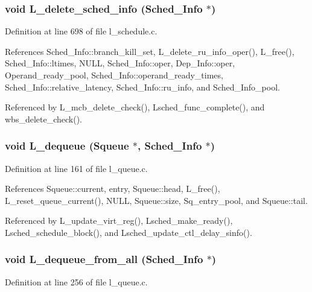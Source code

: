 \subsubsection{\setlength{\rightskip}{0pt plus 5cm}void L\_\-delete\_\-sched\_\-info (\bf{Sched\_\-Info} $\ast$)}\label{l__schedule_8h_fc54ef260623cbb0b6e6c13ab288d747}




Definition at line 698 of file l\_\-schedule.c.

References Sched\_\-Info::branch\_\-kill\_\-set, L\_\-delete\_\-ru\_\-info\_\-oper(), L\_\-free(), Sched\_\-Info::ltimes, NULL, Sched\_\-Info::oper, Dep\_\-Info::oper, Operand\_\-ready\_\-pool, Sched\_\-Info::operand\_\-ready\_\-times, Sched\_\-Info::relative\_\-latency, Sched\_\-Info::ru\_\-info, and Sched\_\-Info\_\-pool.

Referenced by L\_\-mcb\_\-delete\_\-check(), Lsched\_\-func\_\-complete(), and wbs\_\-delete\_\-check().
\subsubsection{\setlength{\rightskip}{0pt plus 5cm}void L\_\-dequeue (\bf{Squeue} $\ast$, \bf{Sched\_\-Info} $\ast$)}\label{l__schedule_8h_c4fccedc1f5ee957f2c5443cc693c0a4}




Definition at line 161 of file l\_\-queue.c.

References Squeue::current, entry, Squeue::head, L\_\-free(), L\_\-reset\_\-queue\_\-current(), NULL, Squeue::size, Sq\_\-entry\_\-pool, and Squeue::tail.

Referenced by L\_\-update\_\-virt\_\-reg(), Lsched\_\-make\_\-ready(), Lsched\_\-schedule\_\-block(), and Lsched\_\-update\_\-ctl\_\-delay\_\-sinfo().
\subsubsection{\setlength{\rightskip}{0pt plus 5cm}void L\_\-dequeue\_\-from\_\-all (\bf{Sched\_\-Info} $\ast$)}\label{l__schedule_8h_db6c1e54d04aef08e8af1be336961318}




Definition at line 256 of file l\_\-queue.c.

